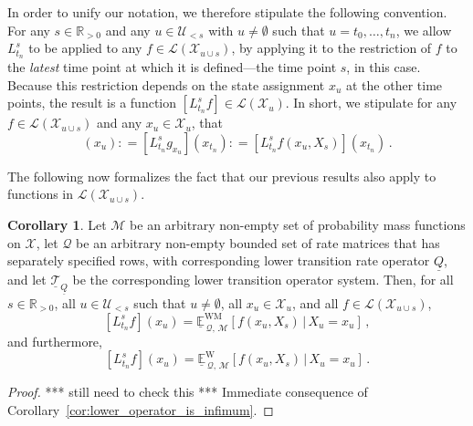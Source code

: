 \documentclass[10pt,a4paper]{paper}
\theoremstyle{definition}
\newtheorem{corollary}[theorem]{Corollary}
\newcommand{\reals}{\mathbb{R}}
\newcommand{\realspos}{\reals_{>0}}
\newcommand{\states}{\mathcal{X}}
\newcommand{\gambles}{\mathcal{L}}
\newcommand{\rateset}{\mathcal{Q}}
\newcommand{\lrate}{\underline{Q}}
\newcommand{\coloneqq}{:\!=}
\begin{document}
In order to unify our notation, we therefore stipulate the following convention. For any $s\in\realspos$ and any $u\in\mathcal{U}_{<s}$ with $u\neq\emptyset$ such that $u=t_0,\ldots,t_n$, we allow $L_{t_n}^s$ to be applied to any $f\in\gambles(\states_{u\cup s})$, by applying it to the restriction of $f$ to the \emph{latest} time point at which it is defined---the time point $s$, in this case. Because this restriction depends on the state assignment $x_u$ at the other time points, the result is a function $[L_{t_n}^sf]\in\gambles(\states_u)$. In short, we stipulate for any $f\in\gambles(\states_{u\cup s})$ and any $x_u\in\states_u$, that
\begin{equation*}
[L_{t_n}^sf](x_u) \coloneqq [L_{t_n}^sg_{x_u}](x_{t_n}) \coloneqq [L_{t_n}^sf(x_u,X_s)](x_{t_n})\,.
\end{equation*}

The following now formalizes the fact that our previous results also apply to functions in $\gambles(\states_{u\cup s})$.

\begin{corollary}\label{cor:inf_works_for_single_future_var}
Let $\mathcal{M}$ be an arbitrary non-empty set of probability mass functions on $\states$, let $\rateset$ be an arbitrary non-empty bounded set of rate matrices that has separately specified rows, with corresponding lower transition rate operator $\lrate$, and let $\underline{\mathcal{T}}_{\lrate}$ be the corresponding lower transition operator system. Then, for all $s\in\realspos$, all $u\in\mathcal{U}_{<s}$ such that $u\neq\emptyset$, all $x_u\in\states_u$, and all $f\in\gambles(\states_{u\cup s})$,
\begin{equation*}
\left[L_{t_n}^s f\right](x_u) = \underline{\mathbb{E}}^{\mathrm{WM}}_{\,\rateset,\,\mathcal{M}}[f(x_u,X_s)\,\vert\,X_u=x_u]\,,
\end{equation*}
and furthermore,
\begin{equation*}
\left[L_{t_n}^s f\right](x_u) = \underline{\mathbb{E}}^\mathrm{W}_{\,\rateset,\,\mathcal{M}}[f(x_u,X_s)\,\vert\,X_u=x_u]\,.
\end{equation*}
\end{corollary}
\begin{proof}
*** still need to check this *** Immediate consequence of Corollary~\ref{cor:lower_operator_is_infimum}.
\end{proof}
\end{document}
